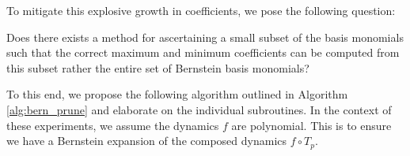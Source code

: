 To mitigate this explosive growth in coefficients, we pose the following question:
%
\begin{tcolorbox}[standard jigsaw, opacityback=0]
Does there exists a method for ascertaining a small subset of the basis monomials such that the correct maximum and minimum coefficients can be computed from this subset rather the entire set of Bernstein basis monomials?
\end{tcolorbox}
%
To this end, we propose the following algorithm outlined in Algorithm \ref{alg:bern_prune} and elaborate on the individual subroutines. In the context of these experiments, we assume the dynamics $f$ are polynomial. This is to ensure we have a Bernstein expansion of the composed dynamics $f \circ T_p$.

\newcommand\litem[1]{\item{\bfseries #1 \\}}

